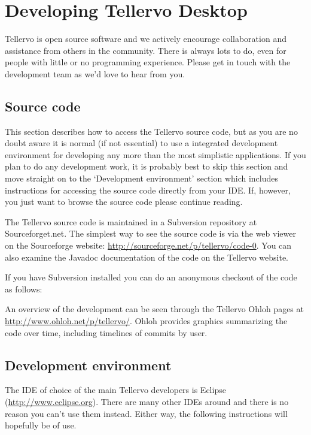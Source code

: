 \chapter{Developing Tellervo Desktop}
\label{txt:devDesktop}
Tellervo is open source software and we actively encourage collaboration and assistance from others in the community.  There is always lots to do, even for people with little or no programming experience.  Please get in touch with the development team as we'd love to hear from you.

\section{Source code}
This section describes how to access the Tellervo source code, but as you are no doubt aware it is normal (if not essential) to use a integrated development environment for developing any more than the most simplistic applications.  If you plan to do any development work, it is probably best to skip this section and move straight on to the `Development environment' section which includes instructions for accessing the source code directly from your IDE.  If, however, you just want to browse the source code please continue reading.

The Tellervo source code is maintained in a Subversion repository at Sourceforget.net.  The simplest way to see the source code is via the web viewer on the Sourceforge website: \url{http://sourceforge.net/p/tellervo/code-0}.  You can also examine the Javadoc documentation of the code on the Tellervo website.

If you have Subversion installed you can do an anonymous checkout of the code as follows:


An overview of the development can be seen through the Tellervo Ohloh pages at \url{http://www.ohloh.net/p/tellervo/}.  Ohloh provides graphics summarizing the code over time, including timelines of commits by user.



\section{Development environment}
The IDE of choice of the main Tellervo developers is Eclipse (\url{http://www.eclipse.org}). There are many other IDEs around and there is no reason you can't use them instead.  Either way, the following instructions will hopefully be of use.

